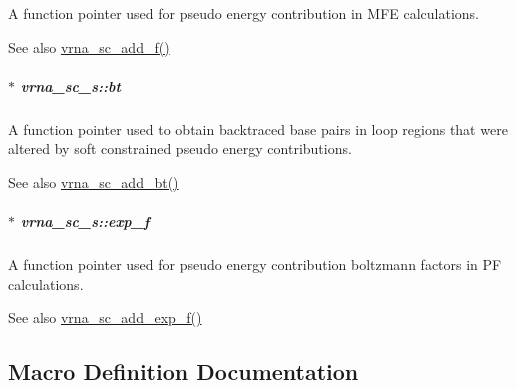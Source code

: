 A function pointer used for pseudo energy contribution in M\+F\+E calculations. 

\begin{DoxySeeAlso}{See also}
\hyperlink{group__generalized__sc_ga8c7d907ec0125cd61c04e0908010a4e9}{vrna\+\_\+sc\+\_\+add\+\_\+f()} 
\end{DoxySeeAlso}
\hypertarget{group__soft__constraints_a2a2aca01782c2b980d7b7fd05b9be89c}{}
\subparagraph[{bt}]{$\ast$ vrna\+\_\+sc\+\_\+s\+::bt}\label{group__soft__constraints_a2a2aca01782c2b980d7b7fd05b9be89c}


A function pointer used to obtain backtraced base pairs in loop regions that were altered by soft constrained pseudo energy contributions. 

\begin{DoxySeeAlso}{See also}
\hyperlink{group__generalized__sc_gabde7d07a79bb9a8f4721aee247b674ea}{vrna\+\_\+sc\+\_\+add\+\_\+bt()} 
\end{DoxySeeAlso}
\hypertarget{group__soft__constraints_a0de08a09f3ccf2f97974d23192668ab0}{}
\subparagraph[{exp\+\_\+f}]{$\ast$ vrna\+\_\+sc\+\_\+s\+::exp\+\_\+f}\label{group__soft__constraints_a0de08a09f3ccf2f97974d23192668ab0}


A function pointer used for pseudo energy contribution boltzmann factors in P\+F calculations. 

\begin{DoxySeeAlso}{See also}
\hyperlink{group__generalized__sc_ga87e382b5d0c9b7d9ce1b79c0473ff700}{vrna\+\_\+sc\+\_\+add\+\_\+exp\+\_\+f()} 
\end{DoxySeeAlso}


\subsection{Macro Definition Documentation}
\hypertarget{group__soft__constraints_ga81e10993d1ae728e4e02022b33155a12}{}
